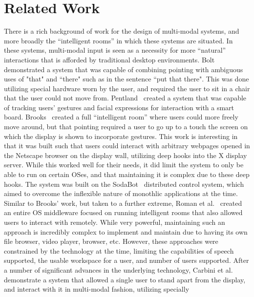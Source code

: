 \section{Related Work}\label{sec:cais_prior_work}

There is a rich background of work for the design of multi-modal systems, and 
more broadly the ``intelligent rooms'' in which these systems are situated. In
these systems, multi-modal input is seen as a necessity for more ``natural''
interactions that is afforded by traditional desktop environments.
Bolt~\cite{bolt_put-that-there:_1980} demonstrated a system that was capable
of combining pointing with ambiguous uses of "that" and ``there" such as in
the sentence ``put that there". This was done utilizing special hardware worn
by the user, and required the user to sit in a chair that the user could not
move from. Pentland~\cite{pentland_smart_1996} created a system that was
capable of tracking users' gestures and facial expressions for interaction
with a smart board. Brooks~\cite{brooks_intelligent_1997} created a full 
``intelligent room'' where users could more freely move around, but
that pointing required a user to go up to a touch the screen on which the
display is shown to incorporate gestures. This work is interesting in that
it was built such that users could interact with arbitrary webpages opened
in the Netscape browser on the display wall, utilizing deep hooks into the X
display server. While this worked well for their needs, it did limit the system
to only be able to run on certain OSes, and that maintaining it is complex due
to these deep hooks. The system was built on the
SodaBot~\cite{coen_sodabot:_1994} distributed control system, which aimed to 
overcome the inflexible nature of monothlic applications at the time. Similar
to Brooks' work, but taken to a further extreme, Roman et 
al.~\cite{roman_middleware_2002} created an entire OS middleware focused on running
intelligent rooms that also allowed users to interact with remotely. While very
powerful, maintaining such an approach is incredibly complex to implement and
maintain due to having its own file browser, video player, browser, etc.
However, these approaches were constrained by the technology at the time,
limiting the capabilities of speech supported, the usable workspace for a
user, and number of users supported. After a number of significant advances in 
the underlying technology, Carbini et al.~\cite{carbini_wizard_2006} 
demonstrate a system that allowed a single user to stand apart from the
display, and interact with it in multi-modal fashion, utilizing specially
